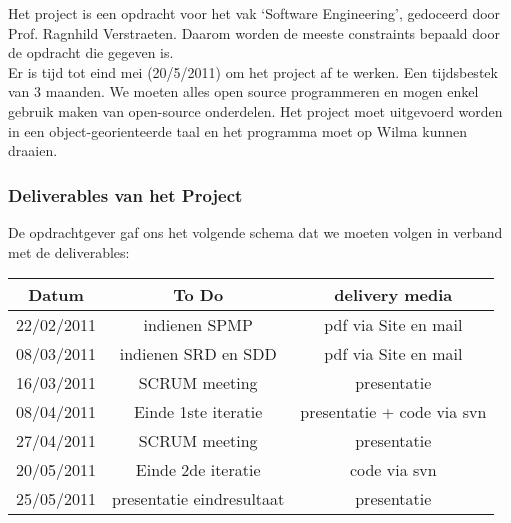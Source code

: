 \documentclass{article}
\begin{document}

Het project is een opdracht voor het vak `Software Engineering', gedoceerd door Prof. Ragnhild Verstraeten. Daarom worden de meeste constraints bepaald door de opdracht die gegeven is. \\
Er is tijd tot eind mei (20/5/2011) om het project af te werken. Een tijdsbestek van 3 maanden. We moeten alles open source programmeren en mogen enkel gebruik maken van open-source onderdelen. Het project moet uitgevoerd worden in een object-georienteerde taal en het programma moet op Wilma kunnen draaien.\\


\subsubsection{Deliverables van het Project}


De opdrachtgever gaf ons het volgende schema dat we moeten volgen in verband met de deliverables:
	

\begin{center}
\begin{tabular}[t]{|c|c|c|}
\hline
Datum	& To Do & delivery media  \\
\hline
\hline
22/02/2011 &	indienen SPMP & pdf via Site en mail\\
\hline
08/03/2011 &	indienen SRD en SDD & pdf via Site en mail\\
\hline
16/03/2011 &	SCRUM meeting & presentatie\\
\hline
08/04/2011 &	Einde 1ste iteratie & presentatie + code via svn \\
\hline
27/04/2011 &	SCRUM meeting & presentatie \\
\hline
20/05/2011 &	Einde 2de iteratie & code via svn\\
\hline
25/05/2011 &	presentatie eindresultaat & presentatie\\
\hline
\end{tabular}
\end{center}
\end{document}
